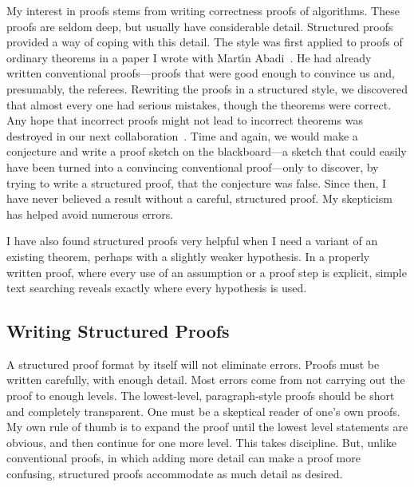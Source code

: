 My interest in proofs stems from writing correctness proofs of
algorithms.  These proofs are seldom deep, but usually have
considerable detail.  Structured proofs provided a way of coping with
this detail.  The style was first applied to proofs of ordinary
theorems in a paper I wrote with Mart\'{\i}n
Abadi~\cite{abadi:existence}.  He had already written conventional
proofs---proofs that were good enough to convince us and, presumably,
the referees.  Rewriting the proofs in a structured style, we
discovered that almost every one had serious mistakes, though the
theorems were correct.  Any hope that incorrect proofs might not lead
to incorrect theorems was destroyed in our next
collaboration~\cite{abadi:composing}.  Time and again, we would make a
conjecture and write a proof sketch on the blackboard---a sketch that
could easily have been turned into a convincing conventional
proof---only to discover, by trying to write a structured proof, that
the conjecture was false.  Since then, I have never believed a result
without a careful, structured proof.  My skepticism has helped avoid
numerous errors.

I have also found structured proofs very helpful when I need a variant
of an existing theorem, perhaps with a slightly weaker hypothesis.  In
a properly written proof, where every use of an assumption or a proof
step is explicit, simple text searching reveals exactly where every
hypothesis is used.

\subsection{Writing Structured Proofs}
\label{sec:how-many-levels}

A structured proof format by itself will not eliminate errors.  Proofs
must be written carefully, with enough detail.  
%
Most errors come from not carrying out the proof to enough levels.
The lowest-level, paragraph-style proofs should be short and
completely transparent.  One must be a skeptical reader of one's own
proofs.  My own rule of thumb is to expand the proof until the lowest
level statements are obvious, and then continue for one more level.
This takes discipline.  But, unlike conventional proofs, in which
adding more detail can make a proof more confusing, structured proofs
accommodate as much detail as desired.

